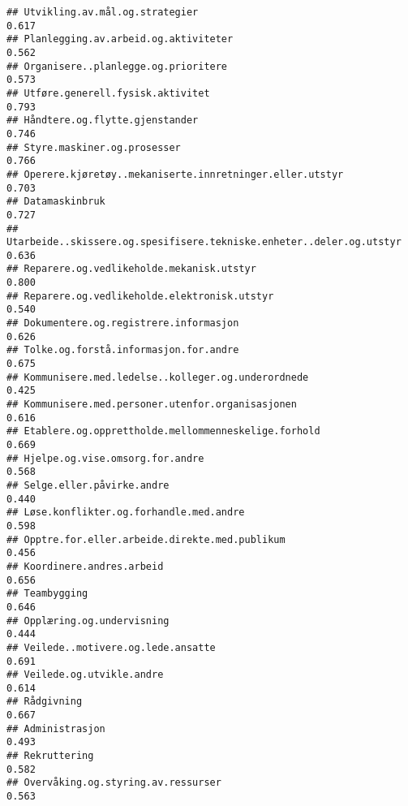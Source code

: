 \documentclass[
]{article}
\begin{document}
\begin{verbatim}
## Utvikling.av.mål.og.strategier                                                   0.617
## Planlegging.av.arbeid.og.aktiviteter                                             0.562
## Organisere..planlegge.og.prioritere                                              0.573
## Utføre.generell.fysisk.aktivitet                                                 0.793
## Håndtere.og.flytte.gjenstander                                                   0.746
## Styre.maskiner.og.prosesser                                                      0.766
## Operere.kjøretøy..mekaniserte.innretninger.eller.utstyr                          0.703
## Datamaskinbruk                                                                   0.727
## Utarbeide..skissere.og.spesifisere.tekniske.enheter..deler.og.utstyr             0.636
## Reparere.og.vedlikeholde.mekanisk.utstyr                                         0.800
## Reparere.og.vedlikeholde.elektronisk.utstyr                                      0.540
## Dokumentere.og.registrere.informasjon                                            0.626
## Tolke.og.forstå.informasjon.for.andre                                            0.675
## Kommunisere.med.ledelse..kolleger.og.underordnede                                0.425
## Kommunisere.med.personer.utenfor.organisasjonen                                  0.616
## Etablere.og.opprettholde.mellommenneskelige.forhold                              0.669
## Hjelpe.og.vise.omsorg.for.andre                                                  0.568
## Selge.eller.påvirke.andre                                                        0.440
## Løse.konflikter.og.forhandle.med.andre                                           0.598
## Opptre.for.eller.arbeide.direkte.med.publikum                                    0.456
## Koordinere.andres.arbeid                                                         0.656
## Teambygging                                                                      0.646
## Opplæring.og.undervisning                                                        0.444
## Veilede..motivere.og.lede.ansatte                                                0.691
## Veilede.og.utvikle.andre                                                         0.614
## Rådgivning                                                                       0.667
## Administrasjon                                                                   0.493
## Rekruttering                                                                     0.582
## Overvåking.og.styring.av.ressurser                                               0.563

\end{verbatim}
\end{document}
